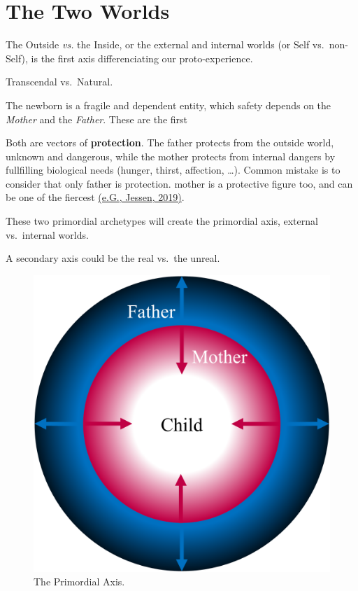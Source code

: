 \documentclass[
]{book}
\begin{document}
\hypertarget{the-two-worlds}{%
\section{The Two Worlds}\label{the-two-worlds}}

The Outside \emph{vs.} the Inside, or the external and internal worlds (or Self vs.~non-Self), is the first axis differenciating our proto-experience.

Transcendal vs.~Natural.

The newborn is a fragile and dependent entity, which safety depends on the \emph{Mother} and the \emph{Father}. These are the first

Both are vectors of \textbf{protection}. The father protects from the outside world, unknown and dangerous, while the mother protects from internal dangers by fullfilling biological needs (hunger, thirst, affection, \ldots). Common mistake is to consider that only father is protection. mother is a protective figure too, and can be one of the fiercest \href{https://doi.org/10.1101/827626}{(e.G., Jessen, 2019)}.

These two primordial archetypes will create the primordial axis, external vs.~internal worlds.

A secondary axis could be the real vs.~the unreal.

\begin{figure}

{\centering \includegraphics[width=\textwidth]{img/protection} 

}

\caption{The Primordial Axis.}\label{fig:unnamed-chunk-14}
\end{figure}
\end{document}
